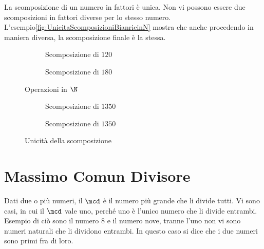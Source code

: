 La scomposizione di un numero in fattori è unica. Non vi possono essere due scomposizioni in fattori diverse per lo stesso numero. L'esempio\nobs\vref{fig:UnicitaScomposizioniBianrieinN} mostra che anche procedendo in maniera diversa, la scomposizione finale è la stessa.
\begin{figure} 
\begin{subfigure}[b]{.5\linewidth}
		\centering

	\caption{Scomposizione di $120$}
	\label{fig:AlberoBinario1}
\end{subfigure}%
\begin{subfigure}[b]{.5\linewidth}
	\centering

	\caption{{Scomposizione di $180$}  }
	\label{fig:AlberoBinario2}
\end{subfigure}
\caption{Operazioni in $\N$}
\label{fig:ScomposizioniBianrieinN}
\end{figure}
\begin{figure} 
\begin{subfigure}[b]{.5\linewidth}
		\centering

	\caption{Scomposizione di $1350$}
	\label{fig:AlberoBinario3}
\end{subfigure}%
\begin{subfigure}[b]{.5\linewidth}
	\centering

	\caption{{Scomposizione di $1350$}  }
	\label{fig:AlberoBinario4}
\end{subfigure}
\caption{Unicità della scomposizione}
\label{fig:UnicitaScomposizioniBianrieinN}
\end{figure}
%
%
%
%
%	
\section{Massimo Comun Divisore}
\label{sec:macdNaturali}
Dati due o più numeri, il $\mcd$ è il numero più grande che li divide tutti. Vi sono casi, in cui il $\mcd$ vale uno, perché uno è l'unico numero che li divide entrambi. Esempio di ciò sono il numero 8 e il numero nove, tranne l'uno non vi sono numeri naturali che li dividono entrambi. In questo caso si dice
 che i due numeri sono primi fra di loro.
 	
